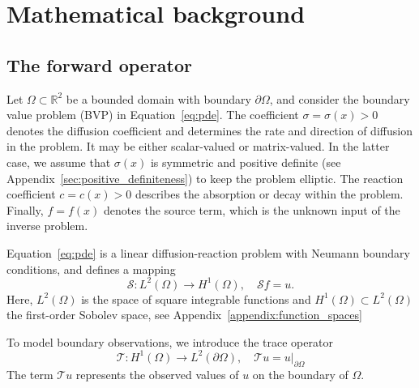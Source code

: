 \section{Mathematical background}


\subsection{The forward operator}

Let $\Omega \subset \mathbb R^2$ be a bounded domain with boundary $\partial \Omega$, and consider the boundary value problem (BVP) in Equation~\eqref{eq:pde}. The coefficient $\sigma = \sigma(x) > 0$ denotes the diffusion coefficient and determines the rate and direction of diffusion in the problem. It may be either scalar-valued or matrix-valued. In the latter case, we assume that $\sigma(x)$ is symmetric and positive definite (see Appendix~\ref{sec:positive_definiteness}) to keep the problem elliptic. The reaction coefficient $c = c(x) > 0$ describes the absorption or decay within the problem. Finally, $f = f(x)$ denotes the source term, which is the unknown input of the inverse problem.

Equation~\eqref{eq:pde} is a linear diffusion-reaction problem with Neumann boundary conditions, and defines a mapping
\begin{equation}\label{eq:S_cont}
    \mathcal S: L^2(\Omega) \rightarrow H^1(\Omega), \quad \mathcal{S} f = u.
\end{equation}
Here, $L^2(\Omega)$ is the space of square integrable functions and $H^1(\Omega) \subset L^2(\Omega)$ the first-order Sobolev space, see Appendix~\ref{appendix:function_spaces}

To model boundary observations, we introduce the trace operator
\begin{equation}\label{eq:trace}
    \mathcal T: H^1(\Omega) \rightarrow L^2(\partial\Omega), \quad \mathcal{T} u = u|_{\partial\Omega}
\end{equation}
The term $\mathcal T u$ represents the observed values of $u$ on the boundary of $\Omega$.

